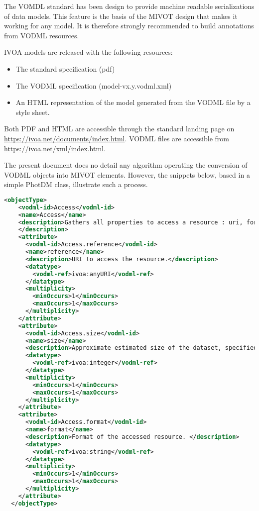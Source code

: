 The VOMDL standard has been design to provide machine readable serializations of data models. 
This feature is the basis of the MIVOT design that makes it working for any model.
It is therefore strongly recommended to build annotations from VODML resources.

IVOA models are released with the following resources:
\begin{itemize}
    \item The standard specification (pdf)
    \item The VODML specification (model-vx.y.vodml.xml)
    \item An HTML representation of the model generated from the VODML file by a style sheet.    
\end{itemize}

Both PDF and HTML are accessible through the standard landing page
on \url{https://ivoa.net/documents/index.html}.
VODML files are accessible from \url{https://ivoa.net/xml/index.html}.

The present document does no detail any algorithm operating the conversion of VODML objects 
into MIVOT elements. However, the snippets below, based in a simple PhotDM class,
illustrate such a process.

\begin{lstlisting}[caption={VODML representation of the PhotDM class \texttt{Access}.
This is an object type with 3 attributes, each one with a cardinality equal  to 1. 
At this stage, we do not know whether attributes are typed with a complex types 
or primitive types. This will come later by going through their own types.},language=XML]
  <objectType>
    <vodml-id>Access</vodml-id>
    <name>Access</name>
    <description>Gathers all properties to access a resource : uri, format and size . 
    </description>
    <attribute>
      <vodml-id>Access.reference</vodml-id>
      <name>reference</name>
      <description>URI to access the resource.</description>
      <datatype>
        <vodml-ref>ivoa:anyURI</vodml-ref>
      </datatype>
      <multiplicity>
        <minOccurs>1</minOccurs>
        <maxOccurs>1</maxOccurs>
      </multiplicity>
    </attribute>
    <attribute>
      <vodml-id>Access.size</vodml-id>
      <name>size</name>
      <description>Approximate estimated size of the dataset, specified in kilobytes.</description>
      <datatype>
        <vodml-ref>ivoa:integer</vodml-ref>
      </datatype>
      <multiplicity>
        <minOccurs>1</minOccurs>
        <maxOccurs>1</maxOccurs>
      </multiplicity>
    </attribute>
    <attribute>
      <vodml-id>Access.format</vodml-id>
      <name>format</name>
      <description>Format of the accessed resource. </description>
      <datatype>
        <vodml-ref>ivoa:string</vodml-ref>
      </datatype>
      <multiplicity>
        <minOccurs>1</minOccurs>
        <maxOccurs>1</maxOccurs>
      </multiplicity>
    </attribute>
  </objectType>
\end{lstlisting}  

